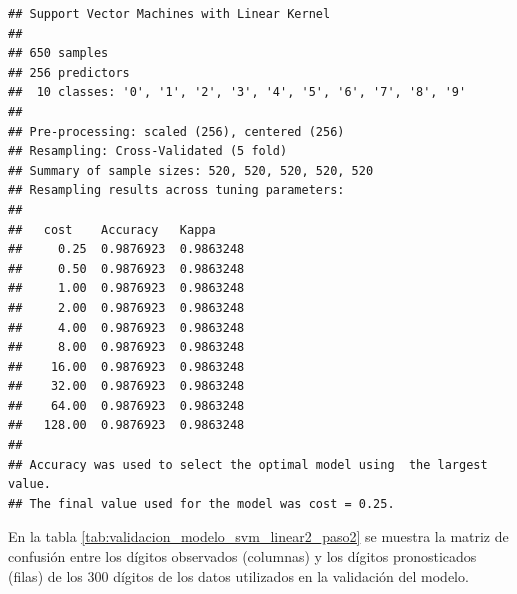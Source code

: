 \documentclass[12pt,spanish,a4paper]{article}
\numberwithin{equation}{section}
\begin{document}
\begin{verbatim}
## Support Vector Machines with Linear Kernel 
## 
## 650 samples
## 256 predictors
##  10 classes: '0', '1', '2', '3', '4', '5', '6', '7', '8', '9' 
## 
## Pre-processing: scaled (256), centered (256) 
## Resampling: Cross-Validated (5 fold) 
## Summary of sample sizes: 520, 520, 520, 520, 520 
## Resampling results across tuning parameters:
## 
##   cost    Accuracy   Kappa    
##     0.25  0.9876923  0.9863248
##     0.50  0.9876923  0.9863248
##     1.00  0.9876923  0.9863248
##     2.00  0.9876923  0.9863248
##     4.00  0.9876923  0.9863248
##     8.00  0.9876923  0.9863248
##    16.00  0.9876923  0.9863248
##    32.00  0.9876923  0.9863248
##    64.00  0.9876923  0.9863248
##   128.00  0.9876923  0.9863248
## 
## Accuracy was used to select the optimal model using  the largest value.
## The final value used for the model was cost = 0.25.
\end{verbatim}

En la tabla \ref{tab:validacion_modelo_svm_linear2_paso2} se muestra la
matriz de confusión entre los dígitos observados (columnas) y los
dígitos pronosticados (filas) de los 300 dígitos de los datos utilizados
en la validación del modelo.

\begin{table}[ht]
\centering
{}
\caption{Matriz de confusión entre los dígitos de validación y los dígitos pronosticados por el modelo.} 
\label{tab:validacion_modelo_svm_linear2_paso2}
\end{table}
\end{document}
